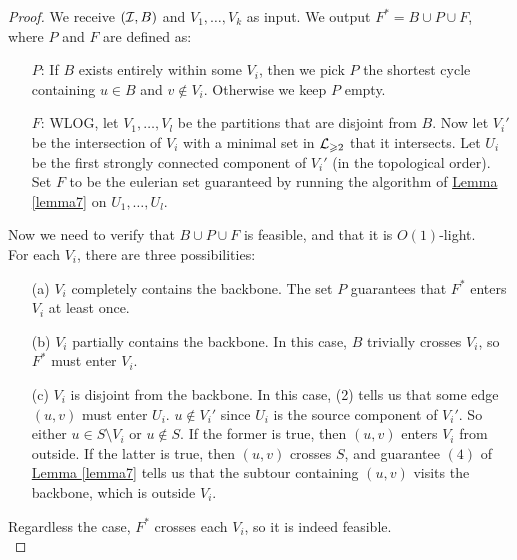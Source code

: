 \documentclass[./main.tex]{subfiles}
\begin{document}
		\begin{proof}
			We receive $(\mathcal{I},B)$ and $V_1,\ldots,V_k$ as input. We output $F^*=B\cup P\cup F$, where $P$ and $F$ are defined as:

			\begin{enumerate}
				\item[$P$:] If $B$ exists entirely within some $V_i$, then we pick $P$ the shortest cycle containing $u\in B$ and $v\notin V_i$. Otherwise we keep $P$ empty.
				\item[$F$:] WLOG, let $V_1,\ldots,V_l$ be the partitions that are disjoint from $B$. Now let $V_i'$ be the intersection of $V_i$ with a minimal set in $\mathcal{L}_{\geqslant 2}$ that it intersects. Let $U_i$ be the first strongly connected component of $V_i'$ (in the topological order). Set $F$ to be the eulerian set guaranteed by running the algorithm of \hyperref[lemma7]{Lemma \ref{lemma7}} on $U_1,\ldots,U_l$.
			\end{enumerate}\vspace{2mm}

			Now we need to verify that $B\cup P\cup F$ is feasible, and that it is $O(1)$-light.\\

			For each $V_i$, there are three possibilities:
			\begin{enumerate}
				\item[(a)] $V_i$ completely contains the backbone. The set $P$ guarantees that $F^*$ enters $V_i$ at least once.
				\item[(b)] $V_i$ partially contains the backbone. In this case, $B$ trivially crosses $V_i$, so $F^*$ must enter $V_i$.
				\item[(c)] $V_i$ is disjoint from the backbone. In this case, (2) tells us that some edge $(u,v)$ must enter $U_i$. $u\notin V_i'$ since $U_i$ is the source component of $V_i'$. So either $u\in S\setminus V_i$ or $u\notin S$. If the former is true, then $(u,v)$ enters $V_i$ from outside. If the latter is true, then $(u,v)$ crosses $S$, and guarantee $(4)$ of \hyperref[lemma7]{Lemma \ref{lemma7}} tells us that the subtour containing $(u,v)$ visits the backbone, which is outside $V_i$.
			\end{enumerate}

			Regardless the case, $F^*$ crosses each $V_i$, so it is indeed feasible.\vspace{2mm}\\


\end{proof}
\end{document}
